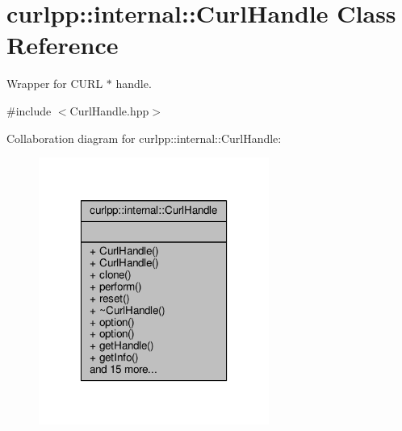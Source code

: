 \hypertarget{classcurlpp_1_1internal_1_1CurlHandle}{\section{curlpp\-:\-:internal\-:\-:Curl\-Handle Class Reference}
\label{classcurlpp_1_1internal_1_1CurlHandle}
}


Wrapper for C\-U\-R\-L $\ast$ handle.  




{\ttfamily \#include $<$Curl\-Handle.\-hpp$>$}



Collaboration diagram for curlpp\-:\-:internal\-:\-:Curl\-Handle\-:\nopagebreak
\begin{figure}[H]
\begin{center}
\leavevmode
\includegraphics[width=214pt]{classcurlpp_1_1internal_1_1CurlHandle__coll__graph}
\end{center}
\end{figure}
